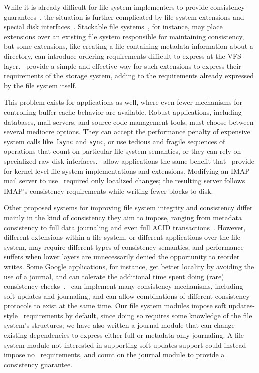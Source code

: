 While it is already difficult for file system implementers to provide
 consistency guarantees~\cite{tweedie98journaling,mckusick99soft},
 the situation is further complicated by file system extensions and
 special disk interfaces~\cite{soules03metadata,fast04versionfs,quinlan02venti,cornell04wayback,wright03ncryptfs,sivathanu03semantically-smart,sivathanu05database-aware}.
%
Stackable file systems~\cite{zadok00fist,zadok99extending,heidemann94filesystem,rosenthal90evolving},
 for instance, may place extensions over an existing file system
 responsible for maintaining consistency, but some extensions, like
 creating a file containing metadata information about a directory,
 can introduce ordering requirements difficult to express at the
 VFS layer.
%
\Patches\ provide a simple and effective way for such extensions to
 express their requirements of the storage system, adding to the
 requirements already expressed by the file system itself.


This problem exists for applications as well, where even fewer mechanisms
 for controlling buffer cache behavior are available.
%
Robust applications, including databases, mail servers, and source code
 management tools, must choose between several mediocre options.
%
They can accept the performance penalty of expensive system calls like
 \texttt{fsync} and \texttt{sync}, or use tedious and fragile sequences
 of operations that count on particular file system semantics, or they
 can rely on specialized raw-disk interfaces.
%
\Patchgroups\ allow applications the same benefit that \patches\ provide
 for kernel-level file system implementations and extensions.
%
Modifying an IMAP mail server to use \patchgroups\ required only localized
 changes; the resulting server follows IMAP's consistency requirements
 while writing fewer blocks to disk. 


Other proposed systems for improving file system integrity and consistency
 differ mainly in the kind of consistency they aim to impose, ranging from
 metadata consistency to full data journaling and even full ACID
 transactions~\cite{gal05transactional,liskov04transactional}.
%
However, different extensions within a file system, or different
 applications over the file system, may require different types of
 consistency semantics, and performance suffers when lower layers are
 unnecessarily denied the opportunity to reorder writes.
%
Some Google applications, for instance, get better locality by avoiding the
 use of a journal, and can tolerate the additional time spent doing (rare)
 consistency checks~\cite{googleext2}.
%
\Patches\ can implement many consistency mechanisms, including
 soft updates and journaling, and can allow combinations of different
 consistency protocols to exist at the same time.
%
Our file system modules impose soft updates-style \patch\ requirements by
 default, since doing so requires some knowledge of the file system's
 structures; we have also written a journal module that can change
 existing dependencies to express either full or metadata-only journaling.
%
A file system module not interested in supporting soft updates support
 could instead impose no \patch\ requirements, and count on the journal
 module to provide a consistency guarantee.


